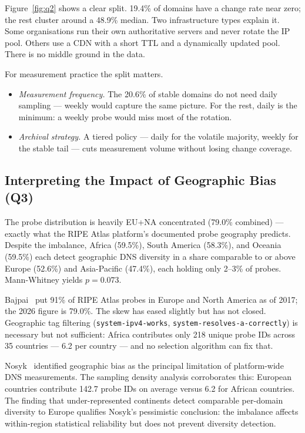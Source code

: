 Figure~\ref{fig:q2} shows a clear split. 19.4\% of domains have a change rate near zero; the rest cluster around a 48.9\% median. Two infrastructure types explain it. Some organisations run their own authoritative servers and never rotate the \ac{IP} pool. Others use a \ac{CDN} with a short \ac{TTL} and a dynamically updated pool. There is no middle ground in the data.

For measurement practice the split matters.

\begin{itemize}
  \item \textit{Measurement frequency.} The 20.6\% of stable domains do not need daily sampling --- weekly would capture the same picture. For the rest, daily is the minimum: a weekly probe would miss most of the rotation.
  \item \textit{Archival strategy.} A tiered policy --- daily for the volatile majority, weekly for the stable tail --- cuts measurement volume without losing change coverage.
\end{itemize}

\bigskip
\subsection{Interpreting the Impact of Geographic Bias (Q3)}
\label{subsec:5.1.3}

The probe distribution is heavily EU+NA concentrated (79.0\% combined) --- exactly what the RIPE Atlas platform's documented probe geography predicts. Despite the imbalance, Africa (59.5\%), South America (58.3\%), and Oceania (59.5\%) each detect geographic \ac{DNS} diversity in a share comparable to or above Europe (52.6\%) and Asia-Pacific (47.4\%), each holding only 2--3\% of probes. Mann-Whitney yields $p = 0.073$.

Bajpai~\cite{Bajpai2017} put 91\% of RIPE Atlas probes in Europe and North America as of 2017; the 2026 figure is 79.0\%. The skew has eased slightly but has not closed. Geographic tag filtering (\texttt{system-ipv4-works}, \texttt{system-resolves-a-correctly}) is necessary but not sufficient: Africa contributes only 218 unique probe IDs across 35 countries --- 6.2 per country --- and no selection algorithm can fix that.

Nosyk~\cite{Nosyk2025} identified geographic bias as the principal limitation of platform-wide \ac{DNS} measurements. The sampling density analysis corroborates this: European countries contribute 142.7 probe IDs on average versus 6.2 for African countries. The finding that under-represented continents detect comparable per-domain diversity to Europe qualifies Nosyk's pessimistic conclusion: the imbalance affects within-region statistical reliability but does not prevent diversity detection.

